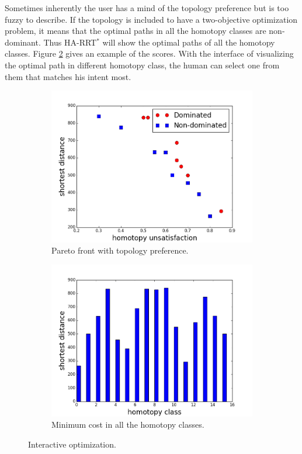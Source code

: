 \documentclass[letterpaper, 10 pt, conference]{ieeeconf}
\begin{document}
Sometimes inherently the user has a mind of the topology preference but is too fuzzy to describe.
If the topology is included to have a two-objective optimization problem, it means that the optimal paths in all the homotopy classes are non-dominant.
Thus HA-RRT$^{*}$ will show the optimal paths of all the homotopy classes.
Figure \ref{fig:homotopy_human_interaction:all_scores} gives an example of the scores.
With the interface of visualizing the optimal path in different homotopy class, the human can select one from them that matches his intent most.

\begin{figure}
	\centering
	\begin{subfigure}[t]{0.47\linewidth}
		\centering
		\includegraphics[width=\textwidth]{fig/pareto_score.png}
		\caption{Pareto front with topology preference.}
		\label{fig:homotopy_human_interaction:pareto_score}
	\end{subfigure}  
	\begin{subfigure}[t]{0.47\linewidth}
		\centering
		\includegraphics[width=\textwidth]{fig/all_homotopy_score.png}
		\caption{Minimum cost in all the homotopy classes.}
		\label{fig:homotopy_human_interaction:all_scores}
	\end{subfigure}   
	\caption{Interactive optimization.}
	\label{fig:homotopy_human_interaction}
\end{figure}
\end{document}
